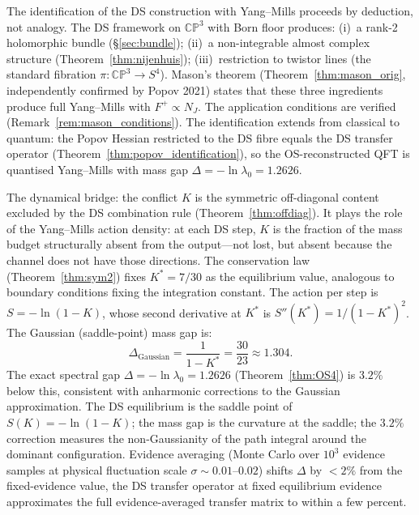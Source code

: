 \documentclass[11pt,a4paper]{article}
\theoremstyle{definition}
\theoremstyle{remark}
\newcommand{\CP}{\mathbb{CP}}
\begin{document}
The identification of the DS construction with Yang--Mills proceeds by deduction, not analogy. The DS framework on $\CP^3$ with Born floor produces: (i)~a rank-2 holomorphic bundle (\S\ref{sec:bundle}); (ii)~a non-integrable almost complex structure (Theorem~\ref{thm:nijenhuis}); (iii)~restriction to twistor lines (the standard fibration $\pi:\CP^3\to S^4$). Mason's theorem (Theorem~\ref{thm:mason_orig}, independently confirmed by Popov 2021) states that these three ingredients produce full Yang--Mills with $F^+\propto N_J$. The application conditions are verified (Remark~\ref{rem:mason_conditions}). The identification extends from classical to quantum: the Popov Hessian restricted to the DS fibre equals the DS transfer operator (Theorem~\ref{thm:popov_identification}), so the OS-reconstructed QFT is quantised Yang--Mills with mass gap $\Delta=-\ln\lambda_0=1.2626$.

The dynamical bridge: the conflict $K$ is the symmetric off-diagonal content excluded by the DS combination rule (Theorem~\ref{thm:offdiag}). It plays the role of the Yang--Mills action density: at each DS step, $K$ is the fraction of the mass budget structurally absent from the output---not lost, but absent because the channel does not have those directions. The conservation law (Theorem~\ref{thm:sym2}) fixes $K^*=7/30$ as the equilibrium value, analogous to boundary conditions fixing the integration constant. The action per step is $S=-\ln(1-K)$, whose second derivative at $K^*$ is $S''(K^*)=1/(1-K^*)^2$. The Gaussian (saddle-point) mass gap is:
\begin{equation}\label{eq:saddle}
\Delta_{\mathrm{Gaussian}}=\frac{1}{1-K^*}=\frac{30}{23}\approx 1.304.
\end{equation}
The exact spectral gap $\Delta=-\ln\lambda_0=1.2626$ (Theorem~\ref{thm:OS4}) is $3.2\%$ below this, consistent with anharmonic corrections to the Gaussian approximation. The DS equilibrium is the saddle point of $S(K)=-\ln(1-K)$; the mass gap is the curvature at the saddle; the $3.2\%$ correction measures the non-Gaussianity of the path integral around the dominant configuration. Evidence averaging (Monte Carlo over $10^3$ evidence samples at physical fluctuation scale $\sigma\sim 0.01$--$0.02$) shifts $\Delta$ by $<2\%$ from the fixed-evidence value, the DS transfer operator at fixed equilibrium evidence approximates the full evidence-averaged transfer matrix to within a few percent.
\end{document}
